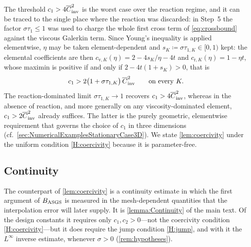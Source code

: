 \begin{remark}\label{rem:c1sharp}
The threshold $c_1>4\overline{C}_{\mathrm{inv}}^2$ is the worst case over the reaction regime, and it can be traced
to the single place where the reaction was discarded: in Step~5 the factor $\sigma\tau_1\le1$
was used to charge the whole first cross term of \eqref{eq:crossbound} against the viscous
Galerkin term. Since Young's inequality is applied elementwise, $\eta$ may be taken
element{\hyp}dependent and $s_K\coloneqq\sigma\tau_{1,K}\in[0,1)$ kept: the elemental
coefficients are then $c_{\mathrm v,K}(\eta)=2-4s_K/\eta-4t$ and $c_{\mathrm r,K}(\eta)=1-\eta t$, whose maximin is
positive if and only if $2-4t(1+s_K)>0$, that is
\begin{equation}\label{eq:c1elemental}
  c_1 > 2\bigl(1+\sigma\tau_{1,K}\bigr)\,\overline{C}_{\mathrm{inv}}^2 \qquad\text{on every } K .
\end{equation}
The reaction{\hyp}dominated limit $\sigma\tau_{1,K}\to1$ recovers $c_1>4\overline{C}_{\mathrm{inv}}^2$, whereas in the
absence of reaction, and more generally on any viscosity{\hyp}dominated element,
$c_1>2\overline{C}_{\mathrm{inv}}^2$ already suffices. The latter is the purely geometric, elementwise requirement
that governs the choice of $c_1$ in three dimensions
(cf.\ \cref{sec:NumericalExamplesStationaryCase3D}). We state \cref{lem:coercivity} under the
uniform condition \cref{H:coercivity} because it is parameter{\hyp}free.
\end{remark}

\subsection{Continuity}\label{sec:continuity}
The counterpart of \cref{lem:coercivity} is a continuity estimate in which the first argument of
$B_{\mathrm{ASGS}} $ is measured in the mesh{\hyp}dependent quantities that the interpolation error will
later supply. It is \cref{lemma:Continuity} of the main text. Of the design constants it
requires only $c_1,c_2>0$---not the coercivity condition \cref{H:coercivity}---but it does
require the jump condition \cref{H:jump}, and with it the $L^\infty$ inverse estimate, whenever
$\sigma>0$ (\cref{rem:hypotheses}).

